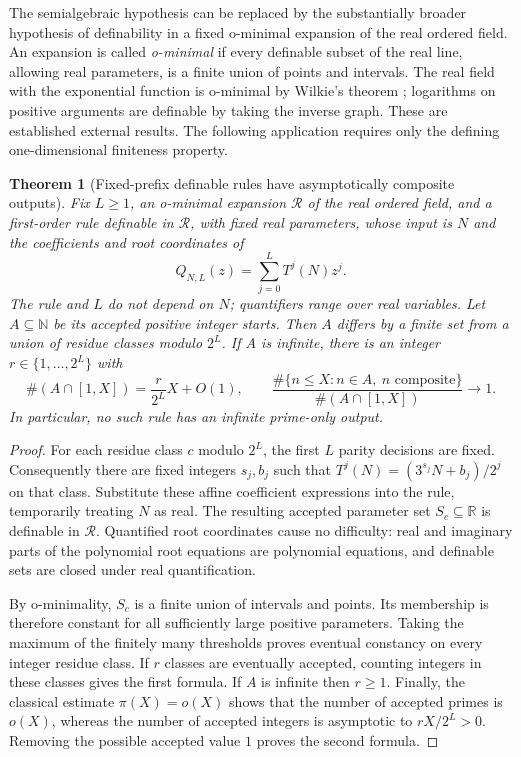 \documentclass[11pt,a4paper]{article}
\newtheorem{theorem}{Theorem}[section]
\theoremstyle{definition}
\theoremstyle{remark}
\numberwithin{equation}{section}
\begin{document}
The semialgebraic hypothesis can be replaced by the substantially broader
hypothesis of definability in a fixed o-minimal expansion of the real
ordered field. An expansion is called \emph{o-minimal} if every definable
subset of the real line, allowing real parameters, is a finite union of
points and intervals. The real field with the exponential function is
o-minimal by Wilkie's theorem \cite{Wilkie1996}; logarithms on positive
arguments are definable by taking the inverse graph. These are established
external results. The following application requires only the defining
one-dimensional finiteness property.

\begin{theorem}[Fixed-prefix definable rules have asymptotically composite outputs]
\label{C:thm:ominimal-prefix}
Fix $L\ge1$, an o-minimal expansion $\mathcal R$ of the real ordered field,
and a first-order rule definable in $\mathcal R$, with fixed real parameters,
whose input is $N$ and the coefficients and root coordinates of
\[
 Q_{N,L}(z)=\sum_{j=0}^L T^j(N)z^j.
\]
The rule and $L$ do not depend on $N$; quantifiers range over real variables.
Let $A\subseteq\mathbb N$ be its accepted positive integer starts.
Then $A$ differs by a finite set from a union of residue classes modulo
$2^L$. If $A$ is infinite, there is an integer $r\in\{1,\ldots,2^L\}$ with
\[
 \#(A\cap[1,X])=\frac{r}{2^L}X+O(1),\qquad
 \frac{\#\{n\le X:n\in A,\ n\text{ composite}\}}
      {\#(A\cap[1,X])}\longrightarrow1.
\]
In particular, no such rule has an infinite prime-only output.
\end{theorem}

\begin{proof}
For each residue class $c$ modulo $2^L$, the first $L$ parity decisions
are fixed. Consequently there are fixed integers $s_j,b_j$ such that
$T^j(N)=(3^{s_j}N+b_j)/2^j$ on that class. Substitute these affine
coefficient expressions into the rule, temporarily treating $N$ as real.
The resulting accepted parameter set $S_c\subseteq\mathbb R$ is definable
in $\mathcal R$. Quantified root coordinates cause no difficulty: real and
imaginary parts of the polynomial root equations are polynomial equations,
and definable sets are closed under real quantification.

By o-minimality, $S_c$ is a finite union of intervals and points. Its
membership is therefore constant for all sufficiently large positive
parameters. Taking the maximum of the finitely many thresholds proves
eventual constancy on every integer residue class. If $r$ classes are
eventually accepted, counting integers in these classes gives the first
formula. If $A$ is infinite then $r\ge1$. Finally, the classical estimate
$\pi(X)=o(X)$ shows that the number of accepted primes is $o(X)$, whereas
the number of accepted integers is asymptotic to $rX/2^L>0$. Removing the
possible accepted value $1$ proves the second formula.
\end{proof}
\end{document}
